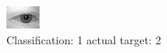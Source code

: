 \begin{figure}[h!]
\begin{center}
\includegraphics[width=0.60\columnwidth]{figures/ID425_class_1_target_2.png}
\end{center}
\caption{ Classification: 1 actual target: 2}
\label{fig:ID425_class_1_target_2}
\end{figure}
